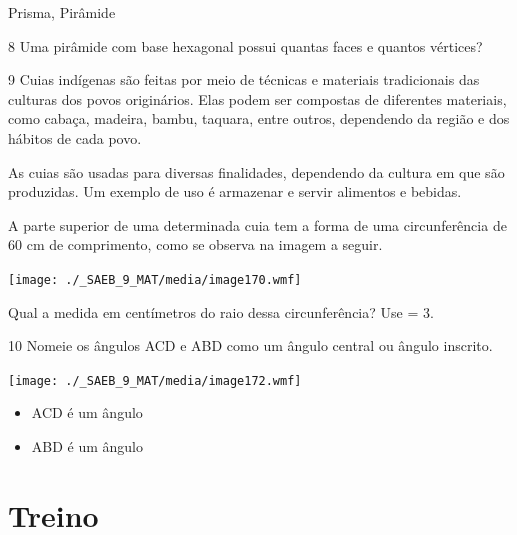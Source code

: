 \begin{escolha}
\begin{escolha}
\begin{minipage}{.5\textwidht}
\begin{escolha}
  \item Prisma, Pirâmide
\end{escolha}
\end{minipage}

\num{8} Uma pirâmide com base hexagonal possui quantas faces e quantos
vértices?

\begin{boxpeq}
\end{boxpeq}

\num{9} Cuias indígenas são feitas por meio de técnicas e materiais tradicionais 
das culturas dos povos originários. Elas podem ser compostas de diferentes
materiais, como cabaça, madeira, bambu, taquara, entre outros, dependendo da
região e dos hábitos de cada povo.

As cuias são usadas para diversas finalidades, dependendo da
cultura em que são produzidas. Um exemplo de uso é armazenar e servir
alimentos e bebidas.

A parte superior de uma determinada cuia tem a forma de uma
circunferência de 60 cm de comprimento, como se observa na imagem a seguir.

\texttt{[image: ./\_SAEB\_9\_MAT/media/image170.wmf]}

Qual a medida em centímetros do raio dessa circunferência? Use \Pi = 3. 


\num{10} Nomeie os ângulos ACD e ABD como um ângulo central ou ângulo
inscrito.

\texttt{[image: ./\_SAEB\_9\_MAT/media/image172.wmf]}


\begin{itemize}
\item ACD é um ângulo 

\item ABD é um ângulo 
\end{itemize}

\section{Treino}


\end{escolha}
\end{escolha}
